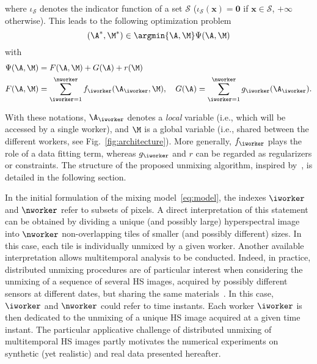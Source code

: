 \documentclass[journal,final,letterpaper,twoside,twocolumn]{IEEEtran}
\begin{document}
%
where $\iota_\mathcal{S}$ denotes the indicator function of a set $\mathcal{S}$ ($\iota_\mathcal{S} (\mathbf{x}) = \mathbf{0}$ if $\mathbf{x} \in \mathcal{S}$, $+\infty$ otherwise). This leads to the following optimization problem
%
\begin{equation} \label{eq:problem}
    (\A^*, \M^*) \in \argmin{\A,\M} \Psi(\A, \M)
\end{equation}
%
with
%
\begin{align}
    & \Psi(\A,\M) = F(\A,\M) + G(\A) + r(\M) \\
    & F(\A,\M) = \sum_{\iworker = 1}^\nworker f_\iworker(\A_\iworker, \M) , \quad G(\A) = \sum_{\iworker = 1}^\nworker g_\iworker (\A_\iworker).
\end{align}

With these notations, $\A_\iworker$ denotes a  \emph{local} variable (i.e., which will be accessed by a single worker), and $\M$ is a global variable (i.e., shared between the different workers, see Fig.~\ref{fig:architecture}). More generally, $f_\iworker$ plays the role of a data fitting term, whereas $g_{\iworker}$ and $r$ can be regarded as regularizers or constraints. The structure of the proposed unmixing algorithm, inspired by~\cite{Cannelli2016}, is detailed in the following section.

\begin{remark} \label{remark1}
    In the initial formulation of the mixing model~\eqref{eq:model}, the indexes $\iworker$ and $\nworker$ refer to subsets of pixels. A direct interpretation of this statement can be obtained by dividing a unique (and possibly large) hyperspectral image into $\nworker$ non-overlapping tiles of smaller (and possibly different) sizes. In this case, each tile is individually unmixed by a given worker. Another available interpretation allows multitemporal analysis to be conducted. Indeed, in practice, distributed unmixing procedures are of particular interest when considering the unmixing of a sequence of several HS images, acquired by possibly different sensors at different dates, but sharing the same materials~\cite{Henrot2016,Thouvenin2015b,Yokoya2017}. In this case, $\iworker$ and $\nworker$ could refer to time instants. Each worker $\iworker$ is then dedicated to the unmixing of a unique HS image acquired at a given time instant. The particular applicative challenge of distributed unmixing of multitemporal HS images partly motivates the numerical experiments on synthetic (yet realistic) and real data presented hereafter.
\end{remark}
\end{document}
